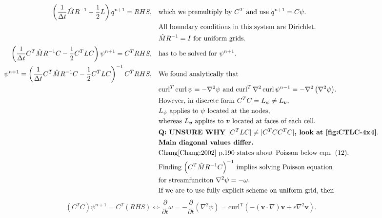 \documentclass{article}
\numberwithin{equation}{section}
\begin{document}
\begin{align*}
	\left(\frac{1}{\Delta t}\hat{M}R^{-1} - \frac{1}{2}L\right)q^{n+1}=RHS, &\quad\text{which we premultiply by $C^T$ and use $q^{n+1}=C\psi$.}\notag\\
	&\quad\text{All boundary conditions in this system are Dirichlet.}\notag\\
	&\quad\text{$	\hat{M}R^{-1}=I$ for uniform grids.}\notag\\
	\left(\frac{1}{\Delta t}C^T\hat{M}R^{-1}C - \frac{1}{2}C^TLC\right)\psi^{n+1}=C^TRHS, &\quad\text{has to be solved for $\psi^{n+1}$.}\notag\\
	\psi^{n+1} = \left(\frac{1}{\Delta t}C^T\hat{M}R^{-1}C - \frac{1}{2}C^TLC\right)^{-1}C^TRHS,\notag
	&\quad\text{We found analytically that  }\notag\\
	&\quad\text{$\operatorname{curl}^T\operatorname{curl}\psi=-\nabla^2\psi$ and $\operatorname{curl}^T\nabla^2\operatorname{curl}\psi^{n-1}=-\nabla^2\left(\nabla^2\psi\right)$.}\notag\\
	&\quad\text{However, in discrete form $C^TC=L_\psi \neq L_{\boldsymbol{v}}$,}\notag\\
	&\quad\text{$L_\psi$ applies to $\psi$ located at the nodes,}\notag\\
	&\quad\text{whereas $L_{\boldsymbol{v}}$ applies to $\boldsymbol{v}$ located at faces of each cell.}\notag\\
	&\quad\text{\textbf{Q: UNSURE WHY $|C^TLC|\neq |C^TCC^TC|$, look at \cref{fig:CTLC-4x4}}.}\notag\\
	&\quad\text{\textbf{Main diagonal values differ.}}\notag\\
	&\quad\text{\text{Chang\cite{Chang:2002} p.190 states about Poisson below eqn. (12).}}\notag\\
	&\quad\text{Finding $\left(C^T\hat{M}R^{-1}C\right)^{-1}$ implies solving Poisson equation}\notag\\
	&\quad\text{for streamfunciton $\nabla^2\psi=-\omega$.}\notag\\
	&\quad\text{If we are to use fully explicit scheme on uniform grid, then}\notag\\
\end{align*}
\begin{equation}
\left(C^TC\right)\psi^{n+1}=C^T\left(RHS\right)\iff
	\frac{\partial }{\partial t}\omega=-\frac{\partial}{\partial t}\left(\nabla^2\psi\right)=\operatorname{curl^T}\left(-(\boldsymbol{v}\cdot \nabla)\boldsymbol{v}+\epsilon\nabla^2\boldsymbol{v}\right).
\end{equation}
\end{document}
